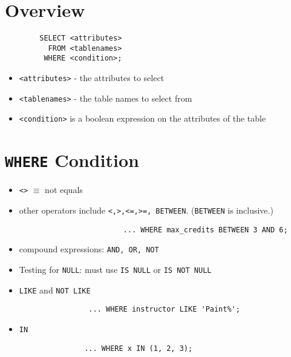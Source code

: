 \documentclass{../cheatsheet}
\begin{document}
\begin{multicols*}{2}
    \section{Overview}
    \begin{verbatim}
        SELECT <attributes>
          FROM <tablenames>
         WHERE <condition>;
    \end{verbatim}

    \begin{itemize}
        \item \texttt{<attributes>} - the attributes to select
        \item \texttt{<tablenames>} - the table names to select from
        \item \texttt{<condition>} is a boolean expression on the attributes of
            the table

    \end{itemize}

    \section{\texttt{WHERE} Condition}
    \begin{itemize}
        \item \texttt{<>} $\equiv$ not equals

        \item other operators include \texttt{<,>,<=,>=, BETWEEN}.
            (\texttt{BETWEEN} is inclusive.)
            \begin{verbatim}
                        ... WHERE max_credits BETWEEN 3 AND 6;
            \end{verbatim}

        \item compound expressions: \texttt{AND, OR, NOT}

        \item Testing for \texttt{NULL}: must use \texttt{IS NULL} or
            \texttt{IS NOT NULL}

        \item \texttt{LIKE} and \texttt{NOT LIKE}
            \begin{verbatim}
                ... WHERE instructor LIKE 'Paint%';
            \end{verbatim}

        \item \texttt{IN}
            \begin{verbatim}
               ... WHERE x IN (1, 2, 3);
            \end{verbatim}
    \end{itemize}


\end{multicols*}
\end{document}
